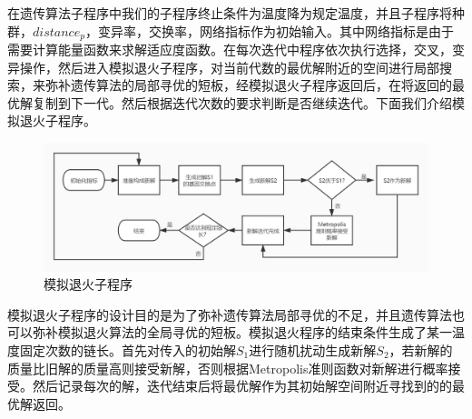 在遗传算法子程序中我们的子程序终止条件为温度降为规定温度，并且子程序将种群，$distance_p$，变异率，交换率，网络指标作为初始输入。其中网络指标是由于需要计算能量函数来求解适应度函数。在每次迭代中程序依次执行选择，交叉，变异操作，然后进入模拟退火子程序，对当前代数的最优解附近的空间进行局部搜索，来弥补遗传算法的局部寻优的短板，经模拟退火子程序返回后，在将返回的最优解复制到下一代。然后根据迭代次数的要求判断是否继续迭代。下面我们介绍模拟退火子程序。
\begin{figure}[H]
    \centering
    \includegraphics[width=13cm]{figure/main_SA.jpg}
    \caption{模拟退火子程序}
    \label{fig:main_SA}
\end{figure}
模拟退火子程序的设计目的是为了弥补遗传算法局部寻优的不足，并且遗传算法也可以弥补模拟退火算法的全局寻优的短板。模拟退火程序的结束条件生成了某一温度固定次数的链长。首先对传入的初始解$S_1$进行随机扰动生成新解$S_2$，若新解的质量比旧解的质量高则接受新解，否则根据Metropolis准则函数对新解进行概率接受。然后记录每次的解，迭代结束后将最优解作为其初始解空间附近寻找到的的最优解返回。
